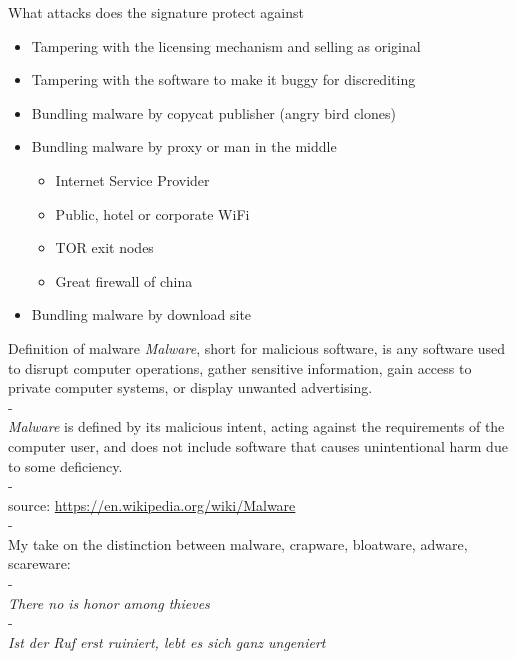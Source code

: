 \documentclass[11pt]{beamer}
\begin{document}
\begin{frame}{What attacks does the signature protect against}
\begin{itemize}
\item Tampering with the licensing mechanism and selling as original
\item Tampering with the software to make it buggy for discrediting
\item Bundling malware by copycat publisher (angry bird clones)
\item Bundling malware by proxy or man in the middle
\begin{itemize}
\item Internet Service Provider
\item Public, hotel or corporate WiFi
\item TOR exit nodes
\item Great firewall of china
\end{itemize}
\item Bundling malware by download site
\end{itemize}
\end{frame}

\begin{frame}{Definition of malware}
\emph{Malware}, short for malicious software, is any software used to disrupt computer operations, gather sensitive information, gain access to private computer systems, or display unwanted advertising.\\
-\\
\emph{Malware} is defined by its malicious intent, acting against the requirements of the computer user, and does not include software that causes unintentional harm due to some deficiency.\\
-\\
source: \href{https://en.wikipedia.org/wiki/Malware}{https://en.wikipedia.org/wiki/Malware}\\
-\\
\pause
My take on the distinction between malware, crapware, bloatware, adware, scareware:\\
-\\
\emph{There no is honor among thieves}\\
-\\
\emph{Ist der Ruf erst ruiniert, lebt es sich ganz ungeniert}
\end{frame}
\end{document}
